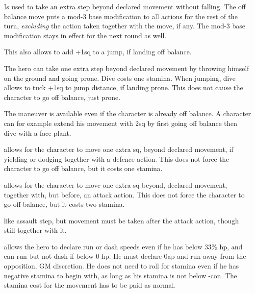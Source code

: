 Is used to take an extra step beyond declared movement without falling. The off balance move puts a mod-3 base modification to all actions for the rest of the turn, \emph{excluding} the action taken together with the move, if any. The mod-3 base modification stays in effect for the next round as well.

This also allows to add +1sq to a jump, if landing off balance.




The hero can take one extra step beyond declared movement by throwing himself on the ground and going prone. Dive costs one stamina.
When jumping, dive allows to tuck +1sq to jump distance, if landing prone. This does not cause the character to go off balance, just prone.

The maneuver is available even if the character is already off balance.
A character can for example extend his movement with 2sq by first going off balance then dive with a face plant.


 allows for the character to move one extra sq, beyond declared movement, if yielding or dodging together with a defence action.
This does not force the character to go off balance, but it costs one stamina.


 allows for the character to move one extra sq beyond, declared movement, together with, but before, an attack action. This does not force the character to go off balance, but it costs two stamina.


 like assault step, but movement must be taken after the attack action, though still together with it.


 allows the hero to declare run or dash speeds even if he has below 33\% hp, and can run but not dash if below 0 hp. He must declare 0ap and run away from the opposition, GM discretion. He does not need to roll for stamina even if he has negative stamina to begin with, as long as his stamina is not below -con. The stamina cost for the movement has to be paid as normal.

